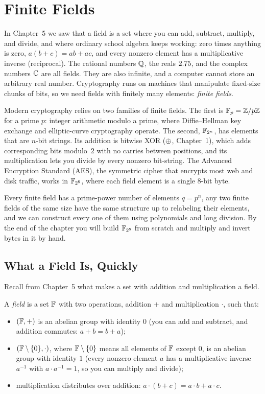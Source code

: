 \chapter{Finite Fields}

In Chapter~5 we saw that a field is a set where you can add, subtract, multiply, and divide, and where ordinary school algebra keeps working: zero times anything is zero, $a(b+c)=ab+ac$, and every nonzero element has a multiplicative inverse (reciprocal). The rational numbers $\mathbb{Q}$, the reals $2.75$, and the complex numbers $\mathbb{C}$ are all fields. They are also infinite, and a computer cannot store an arbitrary real number. Cryptography runs on machines that manipulate fixed-size chunks of bits, so we need fields with finitely many elements: \emph{finite fields}.

Modern cryptography relies on two families of finite fields. The first is $\mathbb{F}_p = \mathbb{Z}/p\mathbb{Z}$ for a prime $p$: integer arithmetic modulo a prime, where Diffie--Hellman key exchange and elliptic-curve cryptography operate. The second, $\mathbb{F}_{2^n}$, has elements that are $n$-bit strings. Its addition is bitwise XOR ($\oplus$, Chapter~1), which adds corresponding bits modulo~$2$ with no carries between positions, and its multiplication lets you divide by every nonzero bit-string. The Advanced Encryption Standard (AES), the symmetric cipher that encrypts most web and disk traffic, works in $\mathbb{F}_{2^8}$, where each field element is a single $8$-bit byte.

Every finite field has a prime-power number of elements $q = p^n$, any two finite fields of the same size have the same structure up to relabeling their elements, and we can construct every one of them using polynomials and long division. By the end of the chapter you will build $\mathbb{F}_{2^8}$ from scratch and multiply and invert bytes in it by hand.

\chapterline

\section{What a Field Is, Quickly}
\label{ch06:what-is-field}

Recall from Chapter~5 what makes a set with addition and multiplication a field.

\begin{definition}[Field]
\label{ch06:def-field}
A \emph{field} is a set $\mathbb{F}$ with two operations, addition $+$ and
multiplication $\cdot$, such that:
\begin{itemize}
  \item $(\mathbb{F}, +)$ is an abelian group with identity $0$ (you can add and
        subtract, and addition commutes: $a + b = b + a$);
  \item $(\mathbb{F} \setminus \{0\}, \cdot)$, where $\mathbb{F} \setminus \{0\}$ means all
        elements of $\mathbb{F}$ except $0$, is an abelian group with identity $1$
        (every nonzero element $a$ has a multiplicative inverse $a^{-1}$ with
        $a \cdot a^{-1} = 1$, so you can multiply and divide);
  \item multiplication distributes over addition: $a\cdot(b+c) = a\cdot b +
        a\cdot c$.
\end{itemize}
\end{definition}

